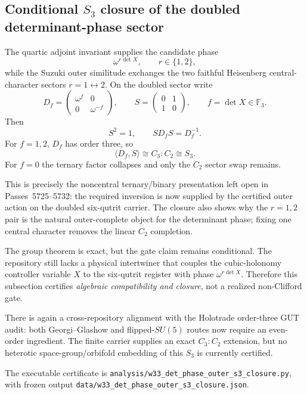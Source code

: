\subsection{Conditional $S_3$ closure of the doubled determinant-phase sector}
\label{sec:20260917-det-phase-outer-s3}

The quartic adjoint invariant supplies the candidate phase
\[
 \omega^{r\det X},\qquad r\in\{1,2\},
\]
while the Suzuki outer similitude exchanges the two faithful Heisenberg
central-character sectors $r=1\leftrightarrow2$.  On the doubled sector write
\[
 D_f=\begin{pmatrix}\omega^f&0\\0&\omega^{-f}\end{pmatrix},
 \qquad
 S=\begin{pmatrix}0&1\\1&0\end{pmatrix},
 \qquad f=\det X\in\mathbb F_3.
\]
Then
\[
 S^2=1,
 \qquad
 SD_fS=D_f^{-1}.
\]
For $f=1,2$, $D_f$ has order three, so
\[
 \boxed{\langle D_f,S\rangle\cong C_3{:}C_2\cong S_3}.
\]
For $f=0$ the ternary factor collapses and only the $C_2$ sector swap remains.

This is precisely the noncentral ternary/binary presentation left open in
Passes~5725--5732: the required inversion is now supplied by the certified
outer action on the doubled six-qutrit carrier.  The closure also shows why the
$r=1,2$ pair is the natural outer-complete object for the determinant phase;
fixing one central character removes the linear $C_2$ completion.

The group theorem is exact, but the gate claim remains conditional.  The
repository still lacks a physical intertwiner that couples the cubic-holonomy
controller variable $X$ to the six-qutrit register with phase
$\omega^{r\det X}$.  Therefore this subsection certifies
\emph{algebraic compatibility and closure}, not a realized non-Clifford gate.

There is again a cross-repository alignment with the Holotrade order-three GUT
audit: both Georgi--Glashow and flipped-$SU(5)$ routes now require an even-order
ingredient.  The finite carrier supplies an exact $C_3{:}C_2$ extension, but no
heterotic space-group/orbifold embedding of this $S_3$ is currently certified.

The executable certificate is
\texttt{analysis/w33\_det\_phase\_outer\_s3\_closure.py}, with frozen output
\texttt{data/w33\_det\_phase\_outer\_s3\_closure.json}.
